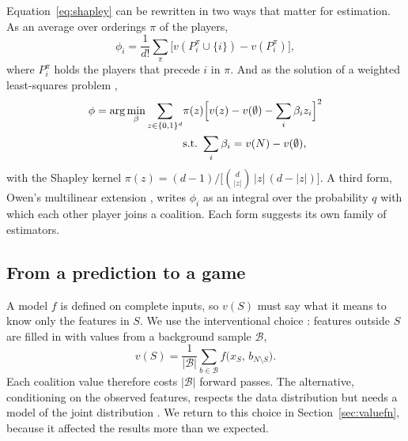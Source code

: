 \documentclass[conference]{IEEEtran}
\begin{document}
Equation~\eqref{eq:shapley} can be rewritten in two ways that matter for estimation. As an average over orderings $\pi$ of the players,
\begin{equation}
\phi_i = \frac{1}{d!}\sum_{\pi}\bigl[v(P_i^\pi\cup\{i\})-v(P_i^\pi)\bigr],
\label{eq:perm}
\end{equation}
where $P_i^\pi$ holds the players that precede $i$ in $\pi$. And as the solution of a weighted least-squares problem \cite{lundberg2017},
\begin{equation}
\begin{split}
\phi=\arg\min_{\beta}\sum_{z\in\{0,1\}^d}&\pi(z)\Bigl[v(z)-v(\emptyset)-\sum_i\beta_i z_i\Bigr]^2\\
&\text{s.t.}\ \sum_i\beta_i=v(N)-v(\emptyset),
\end{split}
\label{eq:wls}
\end{equation}
with the Shapley kernel $\pi(z)=(d-1)/\bigl[\binom{d}{|z|}\,|z|\,(d-|z|)\bigr]$. A third form, Owen's multilinear extension \cite{owen1972}, writes $\phi_i$ as an integral over the probability $q$ with which each other player joins a coalition. Each form suggests its own family of estimators.

\subsection{From a prediction to a game}
A model $f$ is defined on complete inputs, so $v(S)$ must say what it means to know only the features in $S$. We use the interventional choice \cite{janzing2020,covert2021removal}: features outside $S$ are filled in with values from a background sample $\mathcal{B}$,
\begin{equation}
v(S)=\frac{1}{|\mathcal{B}|}\sum_{b\in\mathcal{B}} f\bigl(x_S,\,b_{N\setminus S}\bigr).
\label{eq:vf}
\end{equation}
Each coalition value therefore costs $|\mathcal{B}|$ forward passes. The alternative, conditioning on the observed features, respects the data distribution but needs a model of the joint distribution \cite{aas2021,frye2021}. We return to this choice in Section~\ref{sec:valuefn}, because it affected the results more than we expected.
\end{document}
